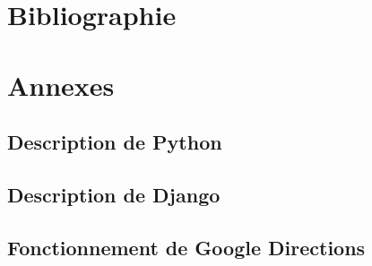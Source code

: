 \documentclass[12pt, a4paper, oneside]{article}
\begin{document}
\section{Bibliographie}
%
%
\section{Annexes}
\subsection{Description de Python}
\subsection{Description de Django}
\subsection{Fonctionnement de Google Directions}
\end{document}
